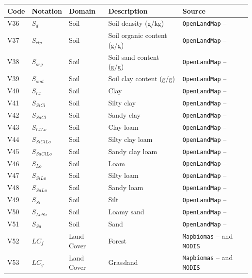 \documentclass[12pt]{article}
\begin{document}
\begin{table}[t]
\centering
\tiny
{}
\begin{tabular}{p{0.5cm}p{1cm}p{2cm}p{3.5cm}p{5cm}}
\toprule
\textbf{Code} & \textbf{Notation} & \textbf{Domain} & \textbf{Description} & \textbf{Source} \\
\midrule
V36 & $S_{d}$ & Soil & Soil density (g/kg) & \texttt{OpenLandMap} -- \cite{hengl2017}\\
V37 & $S_{cly}$ & Soil & Soil organic content (g/g) & \texttt{OpenLandMap} -- \cite{hengl2017}\\
V38 & $S_{org}$ & Soil & Soil sand content (g/g) & \texttt{OpenLandMap} -- \cite{hengl2017}\\
V39 & $S_{snd}$ & Soil & Soil clay content (g/g) & \texttt{OpenLandMap} -- \cite{hengl2017}\\
V40 & $S_{Cl}$ & Soil & Clay & \texttt{OpenLandMap}  -- \cite{hengl2017}\\
V41 & $S_{SiCl}$ & Soil & Silty clay & \texttt{OpenLandMap}  -- \cite{hengl2017}\\
V42 & $S_{SaCl}$ & Soil & Sandy clay & \texttt{OpenLandMap}  -- \cite{hengl2017}\\
V43 & $S_{ClLo}$ & Soil & Clay loam & \texttt{OpenLandMap}  -- \cite{hengl2017}\\
V44 & $S_{SiClLo}$ & Soil & Silty clay loam & \texttt{OpenLandMap}  -- \cite{hengl2017}\\
V45 & $S_{SaClLo}$ & Soil & Sandy clay loam & \texttt{OpenLandMap}  -- \cite{hengl2017}\\
V46 & $S_{Lo}$ & Soil & Loam & \texttt{OpenLandMap}  -- \cite{hengl2017}\\
V47 & $S_{SiLo}$ & Soil & Silty loam & \texttt{OpenLandMap}  -- \cite{hengl2017}\\
V48 & $S_{SaLo}$ & Soil & Sandy loam & \texttt{OpenLandMap}  -- \cite{hengl2017}\\
V49 & $S_{Si}$ & Soil & Silt & \texttt{OpenLandMap}  -- \cite{hengl2017}\\
V50 & $S_{LoSa}$ & Soil & Loamy sand & \texttt{OpenLandMap}  -- \cite{hengl2017}\\
V51 & $S_{Sa}$ & Soil & Sand & \texttt{OpenLandMap}  -- \cite{hengl2017}\\
V52 & $LC_{f}$ & Land Cover & Forest & \texttt{Mapbiomas} -- \cite{souza2020} and \texttt{MODIS}\\
V53 & $LC_{g}$ & Land Cover & Grassland & \texttt{Mapbiomas} -- \cite{souza2020} and \texttt{MODIS}\\

\end{tabular}
\end{table}
\end{document}
